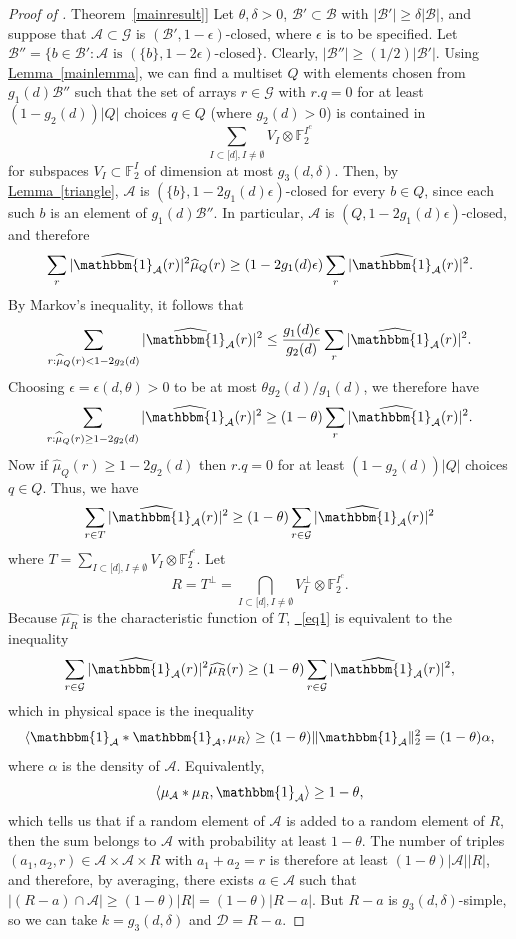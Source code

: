 \documentclass[11pt]{article}
\numberwithin{equation}{section}
\theoremstyle{definition}
\theoremstyle{plain}
\newcommand{\expref}[2]{\hyperref[#2]{#1~\ref{#2}}}
\newcommand{\expeqref}[2]{\hyperref[#2]{#1~\eqref{#2}}}
\newcommand\eps{\epsilon}  %
\newcommand\F{\mathbb{F}}
\renewcommand\a{\alpha}
\renewcommand\d{\delta}
\newcommand{\ind}{\mathbbm{1}}
\newcommand \hcA {{\widehat {\ind_{\mathcal A}}}}
\newcommand \cA{\mathcal A}
\newcommand \cB{\mathcal B}
\newcommand \cD{\mathcal D}
\newcommand \cG{\mathcal G}
\newcommand \s{\subset}
\begin{document}
\begin{proof}[Proof of \expref{Theorem}{mainresult}]
  Let $\theta,\d>0$, $\cB'\s \cB$ with $|\cB'|\geq \d|\cB|$, and suppose that $\cA\s \cG$ is $(\cB',1-\eps)$-closed, where $\eps$ is to be specified. Let $\cB''=\{b\in \cB': \cA \text{ is } (\{b\},1-2\eps) \text{-closed}\}$. Clearly, $|\cB''|\geq ({1}/{2})|\cB'|$. Using \expref{Lemma}{mainlemma}, we can find a multiset $Q$ with elements chosen from $g_1(d)\cB''$ such that the set of arrays $r\in \cG$ with $r.q=0$ for at least $(1-g_2(d))|Q|$ choices $q\in Q$ (where $g_2(d)>0$) is contained in
  \[
    \sum_{I\subset \lbrack d\rbrack, I\neq \emptyset} V_I\otimes \F_2^{I^c}
  \]
  for subspaces $V_I\s \F_2^{I}$ of dimension at most
  $g_3(d,\d)$. Then, by \expref{Lemma}{triangle}, $\cA$ is
  $(\{b\},1-2g_1(d)\eps)$-closed for every $b\in Q$, since each such $b$
  is an element of $g_1(d)\cB''$. In particular, $\cA$ is
  $(Q,1-2g_1(d)\eps)$-closed, and therefore
	\[\sum_r|\hcA(r)|^2\widehat\mu_Q(r)\geq(1-2g_1(d)\eps)\sum_r|\hcA(r)|^2.\]
	By Markov's inequality, it follows that 
	\[\sum_{r:\widehat\mu_Q(r)<1-2g_2(d)}|\hcA(r)|^2\leq\frac{g_1(d)\eps}{g_2(d)}\sum_r|\hcA(r)|^2.\]
	Choosing $\eps=\eps(d,\theta)>0$ to be at most $\theta g_2(d)/g_1(d)$, we therefore have 
	\[\sum_{r:\widehat\mu_Q(r)\geq 1-2g_2(d)}|\hcA(r)|^2\geq(1-\theta)\sum_r|\hcA(r)|^2.\]
	Now if $\widehat\mu_Q(r)\geq 1-2g_2(d)$ then $r.q=0$ for at least $(1-g_2(d))|Q|$ choices $q\in Q$. Thus, we have 
	\begin{equation}
	\sum_{r\in T}|\hcA(r)|^2\geq(1-\theta)\sum_{r\in \cG}|\hcA(r)|^2 \label{eq1}
      \end{equation} where $T=\sum_{I\subset \lbrack d\rbrack, I\neq \emptyset} V_I\otimes \F_2^{I^c}$. Let
      \[
        R=T^{\perp}=\bigcap_{I\subset \lbrack d\rbrack, I\neq \emptyset} V_I^{\perp}\otimes \F_2^{I^c}.
      \]
      Because $\widehat{\mu_R}$ is the characteristic function of $T$,
      \expeqref{}{eq1} is equivalent to the inequality
	\[\sum_{r\in \cG}|\hcA(r)|^2\widehat{\mu_R}(r)\geq (1-\theta)\sum_{r\in \cG}|\hcA(r)|^2,\]
	which in physical space is the inequality 
	\[\langle\ind_{\cA}*\ind_{\cA},\mu_R\rangle\geq (1-\theta)\|\ind_{\cA}\|_2^2=(1-\theta)\a,\]
	where $\a$ is the density of $\cA$. Equivalently,
	\[\langle\mu_{\cA}*\mu_R,\ind_{\cA}\rangle\geq 1-\theta,\]
	which tells us that if a random element of $\cA$ is added to a random element of $R$, then the sum belongs to $\cA$ with probability at least $1-\theta$. The number of triples $(a_1,a_2,r)\in \cA\times \cA\times R$ with $a_1+a_2=r$ is therefore at least $(1-\theta)|\cA||R|$, and therefore, by averaging, there exists $a\in \cA$ such that $|(R-a)\cap \cA|\geq (1-\theta)|R|=(1-\theta)|R-a|$. But $R-a$ is $g_3(d,\d)$-simple, so we can take $k=g_3(d,\d)$ and $\cD=R-a$.
\end{proof}
\end{document}
